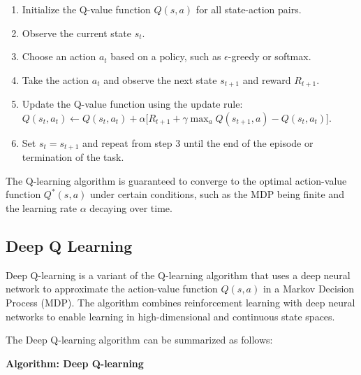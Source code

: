 \documentclass[12pt,oneside]{article}
\begin{document}
\begin{enumerate}
\item Initialize the Q-value function $Q(s, a)$ for all state-action pairs.
\item Observe the current state $s_t$.
\item Choose an action $a_t$ based on a policy, such as $\epsilon$-greedy or softmax.
\item Take the action $a_t$ and observe the next state $s_{t+1}$ and reward $R_{t+1}$.
\item Update the Q-value function using the update rule: $Q(s_t, a_t) \leftarrow Q(s_t, a_t) + \alpha\Big[ R_{t+1} + \gamma\max_{a} Q(s_{t+1}, a) - Q(s_t, a_t) \Big]$.
\item Set $s_t = s_{t+1}$ and repeat from step 3 until the end of the episode or termination of the task.
\end{enumerate}

The Q-learning algorithm is guaranteed to converge to the optimal action-value function $Q^*(s, a)$ under certain conditions, such as the MDP being finite and the learning rate $\alpha$ decaying over time.

\subsection{Deep Q Learning}
Deep Q-learning is a variant of the Q-learning algorithm that uses a deep neural network to approximate the action-value function $Q(s, a)$ in a Markov Decision Process (MDP). The algorithm combines reinforcement learning with deep neural networks to enable learning in high-dimensional and continuous state spaces.

The Deep Q-learning algorithm can be summarized as follows:

\textbf{Algorithm: Deep Q-learning}
\end{document}
